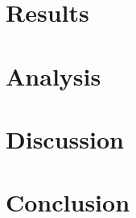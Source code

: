 \documentclass[prb,preprint]{revtex4-1}
\begin{document}
\section{Results}


\section{Analysis}


\section{Discussion}


\section{Conclusion}



\begin{thebibliography}{0}



\end{thebibliography}
\end{document}
